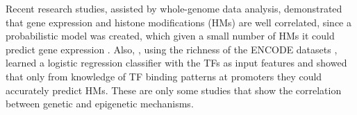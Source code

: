 Recent research studies, assisted by whole-genome data analysis, demonstrated that gene expression and histone modifications (HMs) are well correlated, since a probabilistic model was created, which given a small number of HMs it could predict gene expression \citep{Karlic2010}. Also, \citet{Benveniste2014}, using the richness of the ENCODE datasets \citep{Dunham2012}, learned a logistic regression classifier with the TFs as input features and showed that only from knowledge of TF binding patterns at promoters they could accurately predict HMs. These are only some studies that show the correlation between genetic and epigenetic mechanisms. 